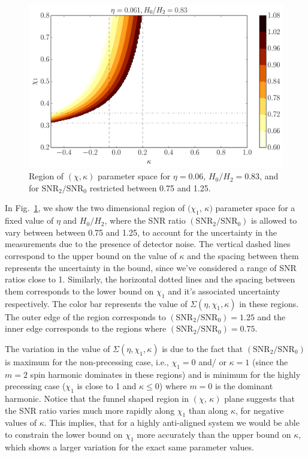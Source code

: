 \begin{figure}[!htbp] 
\centering
\includegraphics[width=0.55\linewidth]{images/SM_bounds.pdf} 
\caption{\small{Region of $(\chi, \kappa)$ parameter space for $\eta=0.06$,
$H_{0}/H_{2}=0.83$, and for $\text{SNR}_2/\text{SNR}_0$ restricted between
0.75 and 1.25.}}
\label{FIG:chi_kappa_region}
\end{figure}

In Fig.~\ref{FIG:chi_kappa_region}, we show the two dimensional region of
$(\chi_1$, $\kappa)$ parameter space for a fixed value of $\eta$ and
$H_0/H_2$, where the SNR ratio $(\text{SNR}_2/\text{SNR}_0)$ is allowed to
vary between between 0.75 and 1.25, to account for the uncertainty in the
measurements due to the presence of detector noise. The vertical dashed lines
correspond to the upper bound on the value of $\kappa$ and the spacing between
them represents the uncertainty in the bound, since we've considered a range
of SNR ratios close to 1. Similarly, the horizontal dotted lines and the
spacing between them corresponds to the lower bound on $\chi_{1}$ and it's
associated uncertainty respectively. The color bar represents the value of
$\Sigma(\eta, \chi_1,
\kappa)$ in these regions. The outer edge of the region corresponds to
$(\text{SNR}_2/\text{SNR}_0)=1.25$ and the inner edge corresponds  to the
regions where $(\text{SNR}_2/\text{SNR}_0)=0.75$. 

The variation in the value of $\Sigma(\eta, \chi_1, \kappa)$  is due to the
fact that $(\text{SNR}_2/\text{SNR}_0)$ is maximum for the non-precessing
case, i.e., $\chi_1=0$ and/ or $\kappa=1$ (since the $m=2$ spin harmonic
dominates in these regions) and is minimum for the highly precessing case
($\chi_1$ is close to 1 and $\kappa \leq 0$) where $m=0$  is the dominant
harmonic. Notice that the funnel shaped region in $(\chi,\,\kappa)$ plane
suggests that the SNR ratio varies much more rapidly along $\chi_1$ than along
$\kappa$, for negative values of $\kappa$. This implies, that for a highly
anti-aligned system we would be able to constrain the lower bound on $\chi_1$
more accurately than the upper bound on $\kappa$, which shows a larger
variation for the exact same parameter values.

